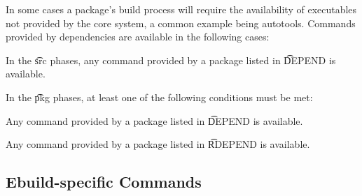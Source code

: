 In some cases a package's build process will require the availability of executables not provided by
the core system, a common example being autotools. Commands provided by dependencies are available
in the following cases:
\begin{compactitem}
\item In the \t{src} phases, any command provided by a package listed in \t{DEPEND} is available.
\item In the \t{pkg} phases, at least one of the following conditions must be met:
    \begin{compactitem}
    \item Any command provided by a package listed in \t{DEPEND} is available.
    \item Any command provided by a package listed in \t{RDEPEND} is available.
    \end{compactitem}
\end{compactitem}

\subsection{Ebuild-specific Commands}



